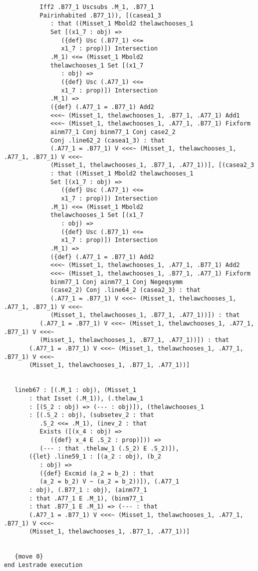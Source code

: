 \documentclass[12pt]{article}
\begin{document}
\begin{verbatim}
          Iff2 .B77_1 Uscsubs .M_1, .B77_1 
          Pairinhabited .B77_1)), [(casea1_3 
             : that ((Misset_1 Mbold2 thelawchooses_1 
             Set [(x1_7 : obj) => 
                ({def} Usc (.B77_1) <<= 
                x1_7 : prop)]) Intersection 
             .M_1) <<= (Misset_1 Mbold2 
             thelawchooses_1 Set [(x1_7 
                : obj) => 
                ({def} Usc (.A77_1) <<= 
                x1_7 : prop)]) Intersection 
             .M_1) => 
             ({def} (.A77_1 = .B77_1) Add2 
             <<<~ (Misset_1, thelawchooses_1, .B77_1, .A77_1) Add1 
             <<<~ (Misset_1, thelawchooses_1, .A77_1, .B77_1) Fixform 
             ainm77_1 Conj binm77_1 Conj case2_2 
             Conj .line62_2 (casea1_3) : that 
             (.A77_1 = .B77_1) V <<<~ (Misset_1, thelawchooses_1, .A77_1, .B77_1) V <<<~ 
             (Misset_1, thelawchooses_1, .B77_1, .A77_1))], [(casea2_3 
             : that ((Misset_1 Mbold2 thelawchooses_1 
             Set [(x1_7 : obj) => 
                ({def} Usc (.A77_1) <<= 
                x1_7 : prop)]) Intersection 
             .M_1) <<= (Misset_1 Mbold2 
             thelawchooses_1 Set [(x1_7 
                : obj) => 
                ({def} Usc (.B77_1) <<= 
                x1_7 : prop)]) Intersection 
             .M_1) => 
             ({def} (.A77_1 = .B77_1) Add2 
             <<<~ (Misset_1, thelawchooses_1, .A77_1, .B77_1) Add2 
             <<<~ (Misset_1, thelawchooses_1, .B77_1, .A77_1) Fixform 
             binm77_1 Conj ainm77_1 Conj Negeqsymm 
             (case2_2) Conj .line64_2 (casea2_3) : that 
             (.A77_1 = .B77_1) V <<<~ (Misset_1, thelawchooses_1, .A77_1, .B77_1) V <<<~ 
             (Misset_1, thelawchooses_1, .B77_1, .A77_1))]) : that 
          (.A77_1 = .B77_1) V <<<~ (Misset_1, thelawchooses_1, .A77_1, .B77_1) V <<<~ 
          (Misset_1, thelawchooses_1, .B77_1, .A77_1))]) : that 
       (.A77_1 = .B77_1) V <<<~ (Misset_1, thelawchooses_1, .A77_1, .B77_1) V <<<~ 
       (Misset_1, thelawchooses_1, .B77_1, .A77_1))]


   lineb67 : [(.M_1 : obj), (Misset_1 
       : that Isset (.M_1)), (.thelaw_1 
       : [(S_2 : obj) => (--- : obj)]), (thelawchooses_1 
       : [(.S_2 : obj), (subsetev_2 : that 
          .S_2 <<= .M_1), (inev_2 : that 
          Exists ([(x_4 : obj) => 
             ({def} x_4 E .S_2 : prop)])) => 
          (--- : that .thelaw_1 (.S_2) E .S_2)]), 
       ({let} .line59_1 : [(a_2 : obj), (b_2 
          : obj) => 
          ({def} Excmid (a_2 = b_2) : that 
          (a_2 = b_2) V ~ (a_2 = b_2))]), (.A77_1 
       : obj), (.B77_1 : obj), (ainm77_1 
       : that .A77_1 E .M_1), (binm77_1 
       : that .B77_1 E .M_1) => (--- : that 
       (.A77_1 = .B77_1) V <<<~ (Misset_1, thelawchooses_1, .A77_1, .B77_1) V <<<~ 
       (Misset_1, thelawchooses_1, .B77_1, .A77_1))]


   {move 0}
end Lestrade execution
\end{verbatim}
\end{document}
